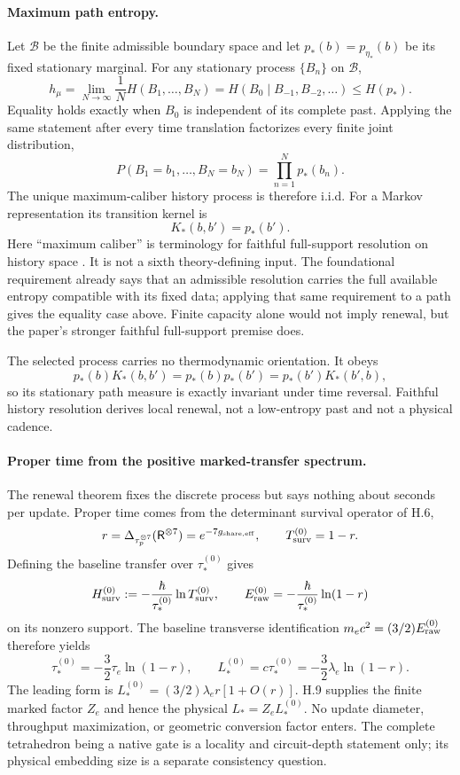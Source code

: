 \documentclass[11pt]{article}
\begin{document}
\paragraph{Maximum path entropy.}
Let $\mathcal B$ be the finite admissible boundary space and let $p_*(b)=p_{\eta_*}(b)$ be its fixed stationary marginal. For any stationary process $\{B_n\}$ on $\mathcal B$,
\[
h_\mu
=
\lim_{N\to\infty}\frac1N H(B_1,\ldots,B_N)
=
H(B_0\mid B_{-1},B_{-2},\ldots)
\le H(p_*).
\]
Equality holds exactly when $B_0$ is independent of its complete past. Applying the same statement after every time translation factorizes every finite joint distribution,
\[
P(B_1=b_1,\ldots,B_N=b_N)=\prod_{n=1}^N p_*(b_n).
\]
The unique maximum-caliber history process is therefore i.i.d. For a Markov representation its transition kernel is
\[
\boxed{K_*(b,b')=p_*(b')}.
\]
Here ``maximum caliber'' is terminology for faithful full-support resolution on history space \citep{Jaynes1980}. It is not a sixth theory-defining input. The foundational requirement already says that an admissible resolution carries the full available entropy compatible with its fixed data; applying that same requirement to a path gives the equality case above. Finite capacity alone would not imply renewal, but the paper's stronger faithful full-support premise does.

The selected process carries no thermodynamic orientation. It obeys
\[
p_*(b)K_*(b,b')=p_*(b)p_*(b')=p_*(b')K_*(b',b),
\]
so its stationary path measure is exactly invariant under time reversal. Faithful history resolution derives local renewal, not a low-entropy past and not a physical cadence.

\paragraph{Proper time from the positive marked-transfer spectrum.}
The renewal theorem fixes the discrete process but says nothing about seconds per update. Proper time comes from the determinant survival operator of H.6,
\[
r=\Delta_{\tau_p^{\otimes7}}(\mathsf R^{\otimes7})=e^{-7g_{\mathrm{share,eff}}},
\qquad
T_{\rm surv}^{(0)}=1-r.
\]
Defining the baseline transfer over $\tau_*^{(0)}$ gives
\[
H_{\rm surv}^{(0)}:=-\frac{\hbar}{\tau_*^{(0)}}\ln T_{\rm surv}^{(0)},
\qquad
E_{\rm raw}^{(0)}=-\frac{\hbar}{\tau_*^{(0)}}\ln(1-r)
\]
on its nonzero support. The baseline transverse identification $m_ec^2=(3/2)E_{\rm raw}^{(0)}$ therefore yields
\[
\boxed{\tau_*^{(0)}=-\frac32\tau_e\ln(1-r)},
\qquad
\boxed{L_*^{(0)}=c\tau_*^{(0)}=-\frac32\lambda_e\ln(1-r)}.
\]
The leading form is $L_*^{(0)}=(3/2)\lambda_e r[1+O(r)]$. H.9 supplies the finite marked factor $Z_e$ and hence the physical $L_*=Z_eL_*^{(0)}$. No update diameter, throughput maximization, or geometric conversion factor enters. The complete tetrahedron being a native gate is a locality and circuit-depth statement only; its physical embedding size is a separate consistency question.
\end{document}
